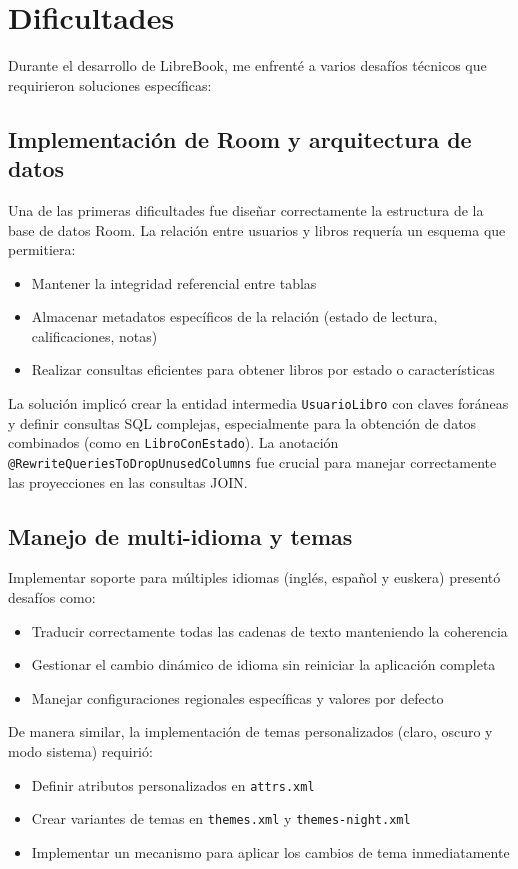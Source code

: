 \documentclass[a4paper,12pt]{report}
\begin{document}
  \chapter{Dificultades}
    Durante el desarrollo de LibreBook, me enfrenté a varios desafíos técnicos que requirieron soluciones específicas:
    
    \section{Implementación de Room y arquitectura de datos}
      Una de las primeras dificultades fue diseñar correctamente la estructura de la base de datos Room. La relación entre usuarios y libros requería un esquema que permitiera:
      \begin{itemize}
          \item Mantener la integridad referencial entre tablas
          \item Almacenar metadatos específicos de la relación (estado de lectura, calificaciones, notas)
          \item Realizar consultas eficientes para obtener libros por estado o características
      \end{itemize}

      La solución implicó crear la entidad intermedia \texttt{UsuarioLibro} con claves foráneas y definir consultas SQL complejas, especialmente para la obtención de datos combinados (como en \texttt{LibroConEstado}). La anotación \texttt{@RewriteQueriesToDropUnusedColumns} fue crucial para manejar correctamente las proyecciones en las consultas JOIN.

    \section{Manejo de multi-idioma y temas}
      Implementar soporte para múltiples idiomas (inglés, español y euskera) presentó desafíos como:
      \begin{itemize}
          \item Traducir correctamente todas las cadenas de texto manteniendo la coherencia
          \item Gestionar el cambio dinámico de idioma sin reiniciar la aplicación completa
          \item Manejar configuraciones regionales específicas y valores por defecto
      \end{itemize}
      
      De manera similar, la implementación de temas personalizados (claro, oscuro y modo sistema) requirió:
      \begin{itemize}
          \item Definir atributos personalizados en \texttt{attrs.xml}
          \item Crear variantes de temas en \texttt{themes.xml} y \texttt{themes-night.xml}
          \item Implementar un mecanismo para aplicar los cambios de tema inmediatamente
      \end{itemize}
      
\end{document}
